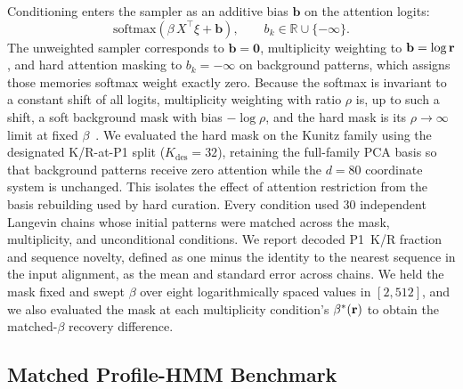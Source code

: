 Conditioning enters the sampler as an additive bias $\mathbf{b}$ on the attention logits:
\[
\mathrm{softmax}(\beta\,X^{\top}\xi + \mathbf{b}),
\qquad b_k \in \mathbb{R} \cup \{-\infty\}.
\]
The unweighted sampler corresponds to $\mathbf{b} = \mathbf{0}$, multiplicity weighting to
$\mathbf{b} = \log\mathbf{r}$, and hard attention masking to $b_k = -\infty$ on background patterns,
which assigns those memories softmax weight exactly zero. Because the softmax is invariant to a
constant shift of all logits, multiplicity weighting with ratio $\rho$ is, up to such a shift, a
soft background mask with bias $-\log\rho$, and the hard mask is its $\rho \to \infty$ limit at
fixed $\beta$~\cite{varnerSAProtein2026}. We evaluated the hard mask on the Kunitz family using
the designated K/R-at-P1 split ($K_{\mathrm{des}} = 32$), retaining the full-family PCA basis so
that background patterns receive zero attention while the $d = 80$ coordinate system is unchanged.
This isolates the effect of attention restriction from the basis rebuilding used by hard
curation. Every condition used 30 independent Langevin chains whose initial patterns were
matched across the mask, multiplicity, and unconditional conditions. We report decoded P1~K/R
fraction and sequence novelty, defined as one minus the identity to the nearest sequence in the
input alignment, as the mean and standard error across chains. We held the mask fixed and swept
$\beta$ over eight logarithmically spaced values in $[2,512]$, and we also evaluated the mask at
each multiplicity condition's $\beta^{*}(\mathbf{r})$ to obtain the matched-$\beta$ recovery difference.

\subsection{Matched Profile-HMM Benchmark}

